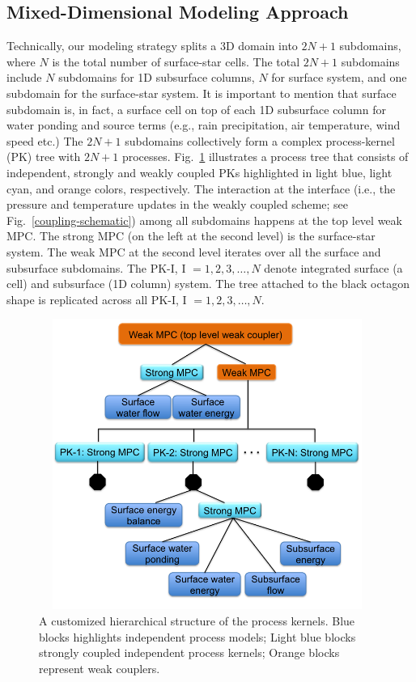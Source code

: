 \documentclass[review]{elsarticle}
\begin{document}
\subsection{Mixed-Dimensional Modeling Approach}
Technically, our modeling strategy splits a 3D domain into $2N+1$ subdomains, where $N$ is the total number of surface-star cells. The total $2N+1$ subdomains include $N$ subdomains for 1D subsurface columns, $N$ for surface system, and one subdomain for the surface-star system. It is important to mention that surface subdomain is, in fact, a surface cell on top of each 1D subsurface column for water ponding and source terms (e.g., rain precipitation, air temperature, wind speed etc.) The $2N+1$ subdomains collectively form a complex process-kernel (PK) tree with $2N+1$ processes. Fig.~\ref{pk-tree} illustrates a process tree that consists of independent, strongly and weakly coupled PKs highlighted in light blue, light cyan, and orange colors, respectively. The interaction at the interface (i.e., the pressure and temperature updates in the weakly coupled scheme; see Fig.~\ref{coupling-schematic})  among all subdomains happens at the top level weak MPC. The strong MPC (on the left at the second level) is the surface-star system. The weak MPC at the second level iterates over all the surface and subsurface subdomains. The PK-I, I $=1,2,3, \dots, N$ denote integrated surface (a cell) and subsurface (1D column) system. The tree attached to the black octagon shape is replicated across all PK-I, I $=1,2,3, \dots, N$.

\begin{figure}[!htpb]
\centering
\includegraphics[height = 9.5cm, width=11cm]{figures/process-tree1.png}
\caption{A customized hierarchical structure of the process kernels. Blue blocks highlights independent process models; Light blue blocks strongly coupled independent process kernels; Orange blocks represent weak couplers.}
\label{pk-tree}
\end{figure}
\end{document}
